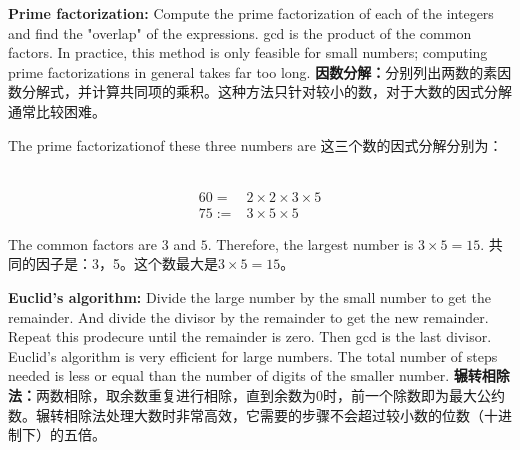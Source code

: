 \begin{paracol}{2}
{\bf Prime factorization:} Compute the prime factorization of each of the integers and find the "overlap" of the expressions. gcd is the product of the common factors. In practice, this method is only feasible for small numbers; computing prime factorizations in general takes far too long.
\switchcolumn 
{\bf 因数分解：}分别列出两数的素因数分解式，并计算共同项的乘积。这种方法只针对较小的数，对于大数的因式分解通常比较困难。
\end{paracol}

\begin{solution}

\begin{paracol}{2}
The prime factorizationof these three numbers are
\switchcolumn 
这三个数的因式分解分别为：
\end{paracol}
\ \\
\begin{align*}
60=& 2\times 2\times 3\times 5\\
75:=&3\times 5\times 5
\end{align*}

\begin{paracol}{2}
The common factors are $3$ and $5$. Therefore, the largest number is $3\times 5 =15$.
\switchcolumn 
共同的因子是：3，5。这个数最大是$3\times 5 =15$。
\end{paracol}
\end{solution}

\begin{paracol}{2}
{\bf Euclid's algorithm:} Divide the large number by the small number to get the remainder. And divide the divisor by the remainder to get the new remainder. Repeat this prodecure until the remainder is zero. Then gcd is the last divisor.  Euclid's algorithm is very efficient for large numbers. The total number of steps needed is less or equal than the number of digits of the smaller number. 
\switchcolumn 
{\bf 辗转相除法：}两数相除，取余数重复进行相除，直到余数为$0$时，前一个除数即为最大公约数。辗转相除法处理大数时非常高效，它需要的步骤不会超过较小数的位数（十进制下）的五倍。
\end{paracol}

